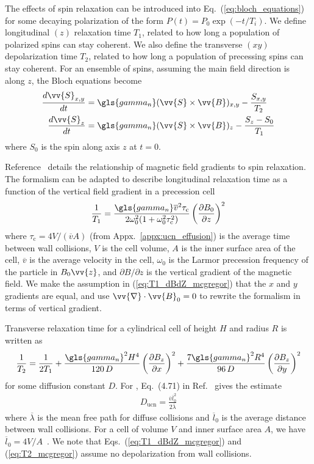 
The effects of spin relaxation can be introduced into Eq.~(\ref{eq:bloch_equations}) for some decaying polarization of the form $P(t)=P_0 \exp(-t/T_i)$. We define longitudinal $(z)$ relaxation time $T_1$, related to how long a population of polarized \ucn spins can stay coherent. We also define the transverse $(xy)$ depolarization time $T_2$, related to how long a population of precessing \ucn spins can stay coherent. For an ensemble of spins, assuming the main field direction is along $z$, the Bloch equations become
%
\begin{align}
    \frac{d\vv{S}_{x,y}}{dt} &= \gls{gamma_n} (\vv{S} \times \vv{B})_{x,y}-\frac{S_{x,y}}{T_2} \\
    \frac{d\vv{S}_z}{dt} &= \gls{gamma_n} (\vv{S} \times \vv{B})_{z}-\frac{S_z-S_0}{T_1}
\end{align}
%
where $S_0$ is the spin along axis $z$ at $t=0$.

Reference~\cite{mcgregor_transverse_1990} details the relationship of magnetic field gradients to spin relaxation. The formalism can be adapted to describe longitudinal relaxation time as a function of the vertical field gradient in a precession cell
%
\begin{gather}
    \frac{1}{T_1}=\frac{\gls{gamma_n} \overline{v}^2 \tau_\text{c}}{2\omega_0^2(1+\omega_0^2\tau_\text{c}^2)}\left(\frac{\partial B_0}{\partial z}\right)^2 \label{eq:T1_dBdZ_mcgregor}
\end{gather}
%
where $\tau_\text{c}=4V/(\overline{v} A)$ (from Appx.~\ref{appx:ucn_effusion}) is the average time between wall collisions, $V$ is the cell volume, $A$ is the inner surface area of the cell, $\overline{v}$ is the average velocity in the cell, $\omega_0$ is the Larmor precession frequency of the particle in $B_0\vv{z}$, and $\partial B/\partial z$ is the vertical gradient of the magnetic field. We make the assumption in (\ref{eq:T1_dBdZ_mcgregor}) that the $x$ and $y$ gradients are equal, and use $\vv{\nabla}\cdot \vv{B}_0=0$ to rewrite the formalism in terms of vertical gradient.

Transverse relaxation time for a cylindrical cell of height $H$ and radius $R$ is written as~\cite{mcgregor_transverse_1990}
%
\begin{gather}
    \frac{1}{T_2}=\frac{1}{2T_1}+\frac{\gls{gamma_n}^2 H^4}{120\,D}\left(\frac{\partial B_z}{\partial x}\right)^2 + \frac{7\gls{gamma_n}^2 R^4}{96\,D}\left( \frac{\partial B_z}{\partial y} \right)^2
    \label{eq:T2_mcgregor}
\end{gather}
%
for some diffusion constant $D$. For \ucn, Eq.~(4.71) in Ref.~\cite{golubUCN} gives the estimate
%
\begin{gather}
    D_\text{ucn}=\frac{\overline{v}\overline{l}_0^2}{2\overline{\lambda}}\label{eq:ucn_diffusion_constant}
\end{gather}
%
where $\overline{\lambda}$ is the mean free path for diffuse collisions and $\overline{l}_0$ is the average distance between wall collisions. For a cell of volume $V$ and inner surface area $A$, we have $\overline{l}_0=4V/A$~\cite{bate_mfp_1947}. We note that Eqs.~(\ref{eq:T1_dBdZ_mcgregor}) and (\ref{eq:T2_mcgregor}) assume no depolarization from wall collisions.

